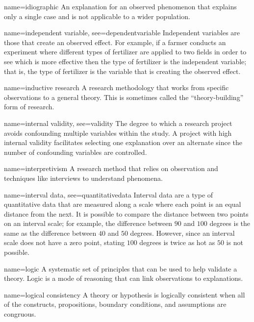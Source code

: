 {name={idiographic}}
{%
	An explanation for an observed phenomenon that explains only a single case and is not applicable to a wider population.
}

{name={independent variable},
	see={dependentvariable}}
{%
	Independent variables are those that create an observed effect. For example, if a farmer conducts an experiment where different types of fertilizer are applied to two fields in order to see which is more effective then the type of fertilizer is the independent variable; that is, the type of fertilizer is the variable that is creating the observed effect.
}

{name={inductive research}}
{%
	A research methodology that works from specific observations to a general theory. This is sometimes called the ``theory-building'' form of research.
}

{name={internal validity},
	see={validity}}
{%
	The degree to which a research project avoids confounding multiple variables within the study. A project with high internal validity facilitates selecting one explanation over an alternate since the number of confounding variables are controlled.
}

{name={interpretivism}}
{%
	A research method that relies on observation and techniques like interviews to understand phenomena. 
}

{name={interval data},
	see={quantitativedata}}
{%
	Interval data are a type of quantitative data that are measured along a scale where each point is an equal distance from the next. It is possible to compare the distance between two points on an interval scale; for example, the difference between $ 90 $ and $ 100 $ degrees is the same as the difference between $ 40 $ and $ 50 $ degrees. However, since an interval scale does not have a zero point, stating $ 100 $ degrees is twice as hot as $ 50 $ is not possible. 
}


{name={logic}}
{%
	A systematic set of principles that can be used to help validate a theory. Logic is a mode of reasoning that can link observations to explanations.
}

{name={logical consistency}}
{%
	A theory or hypothesis is logically consistent when all of the constructs, propositions, boundary conditions, and assumptions are congruous.
}

